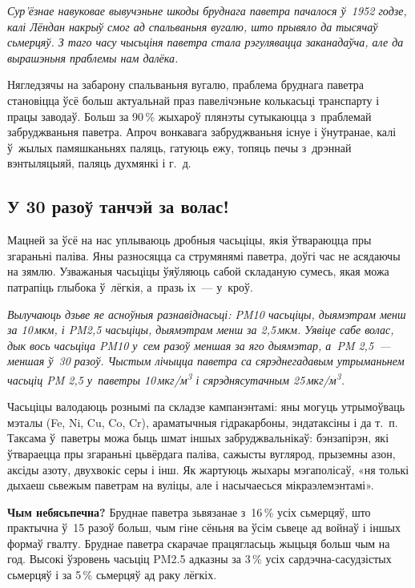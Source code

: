 \emph{Сур'ёзнае навуковае вывучэньне шкоды бруднага паветра пачалося ў~1952 годзе, калі Лёндан накрыў смог ад спальваньня вугалю, што прывяло да тысячаў сьмерцяў. З таго часу чысьціня паветра стала рэгулявацца заканадаўча, але да вырашэньня праблемы нам далёка.}

Нягледзячы на забарону спальваньня вугалю, праблема бруднага паветра становіцца ўсё больш актуальнай праз павелічэньне колькасьці транспарту і працы заводаў. Больш за 90\,\% жыхароў плянэты сутыкаюцца з~праблемай забруджваньня паветра. Апроч вонкавага забруджваньня існуе і ўнутранае, калі ў~жылых памяшканьнях паляць, гатуюць ежу, топяць печы з~дрэннай вэнтыляцыяй, паляць духмянкі і г.~д.

\subsection*{У 30 разоў танчэй за волас!}

Мацней за ўсё на нас уплываюць дробныя часьціцы, якія ўтвараюцца пры згараньні паліва. Яны разносяцца са струмянямі паветра, доўгі час не асядаючы на зямлю. Узважаныя часьціцы ўяўляюць сабой складаную сумесь, якая можа патрапіць глыбока ў~лёгкія, а~празь іх~--- у~кроў.

\emph{Вылучаюць дзьве яе асноўныя разнавіднасьці: PM10 часьціцы, дыямэтрам менш за 10\,мкм, і PM2,5 часьціцы, дыямэтрам менш за 2,5\,мкм. Уявіце сабе волас, дык вось часьціца PM10 у~сем разоў меншая за яго дыямэтар, а~PM 2,5~--- меншая ў~30 разоў. Чыстым лічыцца паветра са сярэднегадавым утрыманьнем часьціц PM 2,5 у~паветры 10\,мкг/м\textsuperscript{3} і сярэднясутачным 25\,мкг/м\textsuperscript{3}.}

Часьціцы валодаюць рознымі па складзе кампанэнтамі: яны могуць утрымоўваць мэталы (Fe, Ni, Cu, Co, Cr), араматычныя гідракарбоны, эндатаксіны і да т.~п. Таксама ў~паветры можа быць шмат іншых забруджвальнікаў: бэнзапірэн, які ўтвараецца пры згараньні цьвёрдага паліва, сажысты вуглярод, прыземны азон, аксіды азоту, двухвокіс серы і інш. Як жартуюць жыхары мэгаполісаў, «ня толькі дыхаеш сьвежым паветрам на вуліцы, але і насычаесься мікраэлемэнтамі».

\textbf{Чым небясьпечна?} Бруднае паветра зьвязанае з~16\,\% усіх сьмерцяў, што практычна ў~15 разоў больш, чым гіне сёньня ва ўсім сьвеце ад войнаў і іншых формаў гвалту. Бруднае паветра скарачае працягласьць жыцьця больш чым на год. Высокі ўзровень часьціц PM2.5 адказны за 3\,\% усіх сардэчна-сасудзістых сьмерцяў і за 5\,\% сьмерцяў ад раку лёгкіх.

